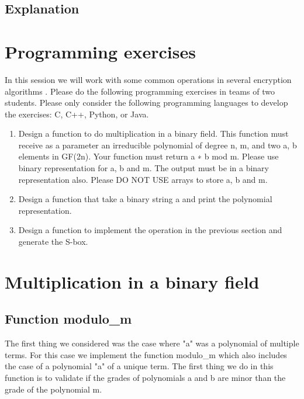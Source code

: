 \documentclass[12pt]{article}
\begin{document}
        \subsection{Explanation}
            
        
    \newpage
    \section{Programming exercises}
        In this session we will work with some common operations in several encryption algorithms . Please do the following programming exercises in teams of two students. Please only consider the following programming languages to develop the exercises: C, C++, Python, or Java.

        \begin{enumerate}
            \item Design a function to do multiplication in a binary field. This function must receive as a parameter an irreducible polynomial of degree n, m, and two a, b elements in GF(2n). Your function must return a ∗ b mod m. Please use binary representation for a, b and m. The output must be in a binary representation also. Please DO NOT USE arrays to store a, b and m.

            \item Design a function that take a binary string a and print the polynomial representation.

            \item Design a function to implement the operation in the previous section and generate the S-box.

        \end{enumerate}   

    \section{Multiplication in a binary field}
        
        \subsection{Function modulo\_m}
            The first thing we considered was the case where "a" was a polynomial of multiple terms. For this case we implement the function {modulo\_m} which also includes the case of a polynomial "a" of a unique term. 
            The first thing we do in this function is to validate if the grades of polynomials a and b are minor than the grade of the polynomial m.
            
\end{document}
